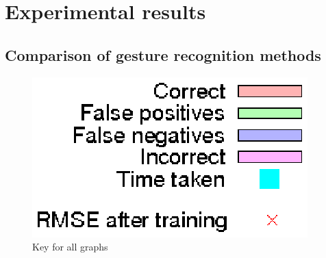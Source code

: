 \documentclass[12pt,a4,notitlepage]{report}
\renewcommand{\_}{\texttt{\symbol{95}}}
\newcommand{\<}{\texttt{\symbol{60}}}
\renewcommand{\>}{\texttt{\symbol{62}}}
\begin{document}
\section{Experimental results}

\subsection{Comparison of gesture recognition methods}

\begin{figure}
\centering
\includegraphics[scale=0.7,angle=0]{results/key.ps}
\caption{Key for all graphs}
\label{key}
\end{figure}
\end{document}
